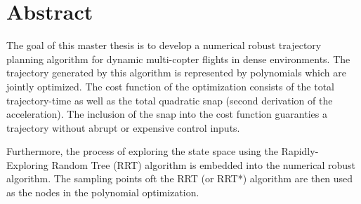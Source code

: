 




 \setcounter{tocdepth}{2}
 \tableofcontents

 \cleardoublepage







\chapter*{Abstract}

The goal of this master thesis is to develop a numerical robust trajectory planning algorithm for dynamic multi-copter flights in dense environments. The trajectory generated by this algorithm is represented by polynomials which are jointly optimized. The cost function of the optimization consists of the total trajectory-time as well as the total quadratic snap (second derivation of the acceleration). The inclusion of the snap into the cost function guaranties a trajectory without abrupt or expensive control inputs. \newline

Furthermore, the process of exploring the state space using the Rapidly-Exploring Random Tree (RRT) algorithm is embedded into the numerical robust algorithm. The sampling points oft the RRT (or RRT*) algorithm are then used as the nodes in the polynomial optimization.


\newpage


